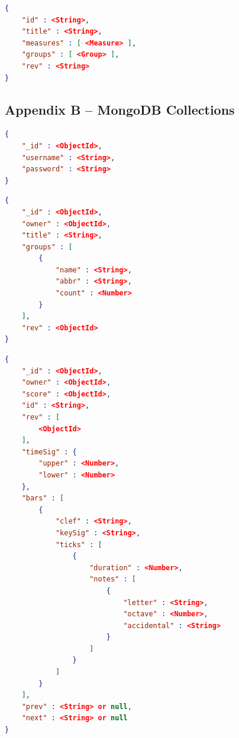 \documentclass[letterpaper,12pt]{article}
\begin{document}
\begin{lstlisting}[language=json, caption=MusicScore]
{
    "id" : <String>,
    "title" : <String>,
    "measures" : [ <Measure> ],
    "groups" : [ <Group> ],
    "rev" : <String>
}
\end{lstlisting}

\subsection{Appendix B -- MongoDB Collections}

\begin{lstlisting}[language=json, caption=users]
{
    "_id" : <ObjectId>,
    "username" : <String>,
    "password" : <String>
}
\end{lstlisting}

\begin{lstlisting}[language=json, caption=musicScores]
{
    "_id" : <ObjectId>,
    "owner" : <ObjectId>,
    "title" : <String>,
    "groups" : [
        {
            "name" : <String>,
            "abbr" : <String>,
            "count" : <Number>
        }
    ],
    "rev" : <ObjectId>
}
\end{lstlisting}

\begin{lstlisting}[language=json, caption=measures]
{
    "_id" : <ObjectId>,
    "owner" : <ObjectId>,
    "score" : <ObjectId>,
    "id" : <String>,
    "rev" : [
        <ObjectId>
    ],
    "timeSig" : {
        "upper" : <Number>,
        "lower" : <Number>
    },
    "bars" : [
        {
            "clef" : <String>,
            "keySig" : <String>,
            "ticks" : [
                {
                    "duration" : <Number>,
                    "notes" : [
                        {
                            "letter" : <String>,
                            "octave" : <Number>,
                            "accidental" : <String>
                        }
                    ]
                }
            ]
        }
    ],
    "prev" : <String> or null,
    "next" : <String> or null
}
\end{lstlisting}
\end{document}
